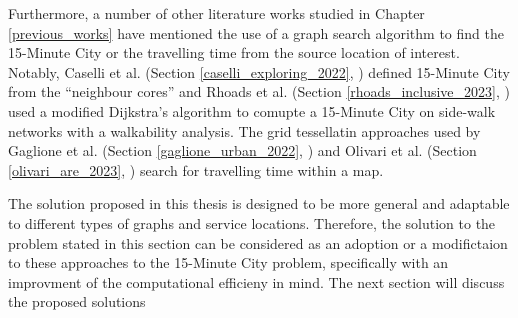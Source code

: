 Furthermore, a number of other literature works studied in Chapter \ref{previous_works} have mentioned the use of a graph search algorithm to find the 15-Minute City or the travelling time from the source location of interest. Notably, Caselli et al. (Section \ref{caselli_exploring_2022}, \cite{caselli_exploring_2022}) defined 15-Minute City from the ``neighbour cores'' and Rhoads et al. (Section \ref{rhoads_inclusive_2023}, \cite{rhoads_inclusive_2023}) used a modified Dijkstra's algorithm to comupte a 15-Minute City on side-walk networks with a walkability analysis. The grid tessellatin approaches used by Gaglione et al. (Section \ref{gaglione_urban_2022}, \cite{gaglione_urban_2022}) and Olivari et al. (Section \ref{olivari_are_2023}, \cite{olivari_are_2023}) search for travelling time within a map.

The solution proposed in this thesis is designed to be more general and adaptable to different types of graphs and service locations. Therefore, the solution to the problem stated in this section can be considered as an adoption or a modifictaion to these approaches to the 15-Minute City problem, specifically with an improvment of the computational efficieny in mind. The next section will discuss the proposed solutions